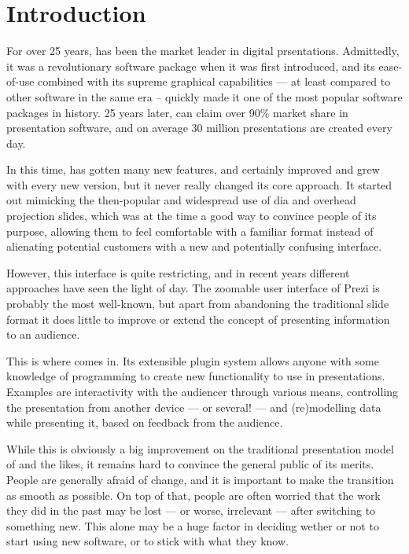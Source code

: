 
 \chapter{Introduction}

  For over 25 years, \ppt* has been the market leader in digital prsentations.
  Admittedly, it was a revolutionary software package when it was first
  introduced, and its ease-of-use combined with its supreme graphical
  capabilities --- at least compared to other software in the same era --
  quickly made it one of the most popular software packages in history. 25
  years later, \ppt* can claim over 90\% market share in presentation software,
  and on average 30 million \ppt presentations are created every day.

  In this time, \ppt* has gotten many new features, and certainly improved and
  grew with every new version, but it never really changed its core approach.
  It started out mimicking the then-popular and widespread use of dia and
  overhead projection slides, which was at the time a good way to convince
  people of its purpose, allowing them to feel comfortable with a familiar
  format instead of alienating potential customers with a new and potentially
  confusing interface.

  However, this interface is quite restricting, and in recent years different
  approaches have seen the light of day. The zoomable user interface of Prezi
  is probably the most well-known, but apart from abandoning the traditional
  slide format it does little to improve or extend the concept of presenting
  information to an audience.

  This is where \mxp comes in. Its extensible plugin system allows anyone with
  some knowledge of programming to create new functionality to use in
  presentations. Examples are interactivity with the audiencer through various
  means, controlling the presentation from another device --- or several! ---
  and (re)modelling data while presenting it, based on feedback from the
  audience.

  While this is obviously a big improvement on the traditional presentation
  model of \ppt* and the likes, it remains hard to convince the general public
  of its merits. People are generally afraid of change, and it is important to
  make the transition as smooth as possible. On top of that, people are often
  worried that the work they did in the past may be lost --- or worse,
  irrelevant --- after switching to something new. This alone may be a huge
  factor in deciding wether or not to start using new software, or to stick
  with what they know.

